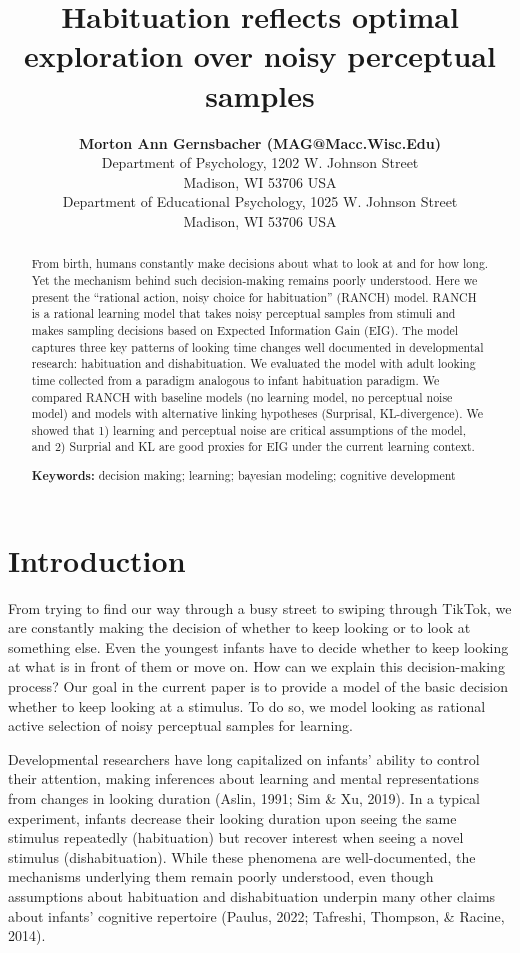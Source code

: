 \documentclass[10pt, letterpaper]{article}
\title{Habituation reflects optimal exploration over noisy perceptual
samples}
\author{{\large \bf Morton Ann Gernsbacher (MAG@Macc.Wisc.Edu)} \\ Department of Psychology, 1202 W. Johnson Street \\ Madison, WI 53706 USA \AND {\large \bf Sharon J.~Derry (SDJ@Macc.Wisc.Edu)} \\ Department of Educational Psychology, 1025 W. Johnson Street \\ Madison, WI 53706 USA}
\begin{document}
\maketitle

\begin{abstract}
From birth, humans constantly make decisions about what to look at and
for how long. Yet the mechanism behind such decision-making remains
poorly understood. Here we present the ``rational action, noisy choice
for habituation'' (RANCH) model. RANCH is a rational learning model that
takes noisy perceptual samples from stimuli and makes sampling decisions
based on Expected Information Gain (EIG). The model captures three key
patterns of looking time changes well documented in developmental
research: habituation and dishabituation. We evaluated the model with
adult looking time collected from a paradigm analogous to infant
habituation paradigm. We compared RANCH with baseline models (no
learning model, no perceptual noise model) and models with alternative
linking hypotheses (Surprisal, KL-divergence). We showed that 1)
learning and perceptual noise are critical assumptions of the model, and
2) Surprial and KL are good proxies for EIG under the current learning
context.

\textbf{Keywords:}
decision making; learning; bayesian modeling; cognitive development
\end{abstract}

\hypertarget{introduction}{%
\section{Introduction}\label{introduction}}

From trying to find our way through a busy street to swiping through
TikTok, we are constantly making the decision of whether to keep looking
or to look at something else. Even the youngest infants have to decide
whether to keep looking at what is in front of them or move on. How can
we explain this decision-making process? Our goal in the current paper
is to provide a model of the basic decision whether to keep looking at a
stimulus. To do so, we model looking as rational active selection of
noisy perceptual samples for learning.

Developmental researchers have long capitalized on infants' ability to
control their attention, making inferences about learning and mental
representations from changes in looking duration (Aslin, 1991; Sim \&
Xu, 2019). In a typical experiment, infants decrease their looking
duration upon seeing the same stimulus repeatedly (habituation) but
recover interest when seeing a novel stimulus (dishabituation). While
these phenomena are well-documented, the mechanisms underlying them
remain poorly understood, even though assumptions about habituation and
dishabituation underpin many other claims about infants' cognitive
repertoire (Paulus, 2022; Tafreshi, Thompson, \& Racine, 2014).
\end{document}
